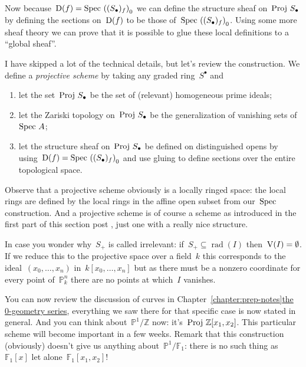 Now because~$\operatorname{D}(f)=\operatorname{Spec\,}\left( (S_\bullet)_f \right)_0$ we can define the structure sheaf on~$\operatorname{Proj\,} S_\bullet$ by defining the sections on~$\operatorname{D}(f)$ to be those of~$\operatorname{Spec\,}\left( (S_\bullet)_f \right)_0$. Using some more sheaf theory we can prove that it is possible to glue these local definitions to a ``global sheaf''.

I have skipped a lot of the technical details, but let's review the construction. We define a \emph{projective scheme} by taking any graded ring~$S^\bullet$ and
\begin{enumerate}
  \item let the set~$\operatorname{Proj\,} S_\bullet$ be the set of (relevant) homogeneous prime ideals;
  \item let the Zariski topology on~$\operatorname{Proj\,} S_\bullet$ be the generalization of vanishing sets of~$\operatorname{Spec\,} A$;
  \item let the structure sheaf on~$\operatorname{Proj\,} S_\bullet$ be defined on distinguished opens by using~$\operatorname{D}(f)=\operatorname{Spec\,}\left( (S_\bullet)_f \right)_0$ and use gluing to define sections over the entire topological space.
\end{enumerate}
Observe that a projective scheme obviously is a locally ringed space: the local rings are defined by the local rings in the affine open subset from our~$\operatorname{Spec\,}$ construction. And a projective scheme is of course a scheme as introduced in the first part of this \iftex section \fi\ifblog post \fi, just one with a really nice structure.

\begin{remark}
  In case you wonder why~$S_+$ is called irrelevant: if~$S_+\subseteq\operatorname{rad}(I)$ then~$\operatorname{V}(I)=\emptyset$. If we reduce this to the projective space over a field~$k$ this corresponds to the ideal~$(x_0,\ldots,x_n)$ in~$k[x_0,\ldots,x_n]$ but as there must be a nonzero coordinate for every point of~$\mathbb{P}^n_k$ there are no points at which~$I$ vanishes.
\end{remark}

You can now review the discussion of curves in \iftex Chapter~\ref{chapter:prep-notes}\fi\ifblog\href{http://www.noncommutative.org/index.php/series/prep-notes}{the 0-geometry series}\fi, everything we saw there for that specific case is now stated in general. And you can think about~$\mathbb{P}^1/\mathbb{Z}$ now: it's~$\operatorname{Proj\,}\mathbb{Z}[x_1,x_2]$. This particular scheme will become important in a few weeks. Remark that this construction (obviously) doesn't give us anything about~$\mathbb{P}^1/\mathbb{F}_1$: there is no such thing as~$\mathbb{F}_1[x]$ let alone~$\mathbb{F}_1[x_1,x_2]$!

